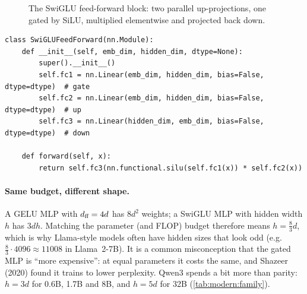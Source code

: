 \begin{figure}[t]
\centering
{}
\caption{The SwiGLU feed-forward block: two parallel up-projections, one gated by SiLU, multiplied
elementwise and projected back down.}
\label{fig:modern:swiglu}
\end{figure}

\begin{lstlisting}[caption={SwiGLU feed-forward network.},label={lst:modern:swiglu}]
class SwiGLUFeedForward(nn.Module):
    def __init__(self, emb_dim, hidden_dim, dtype=None):
        super().__init__()
        self.fc1 = nn.Linear(emb_dim, hidden_dim, bias=False, dtype=dtype)  # gate
        self.fc2 = nn.Linear(emb_dim, hidden_dim, bias=False, dtype=dtype)  # up
        self.fc3 = nn.Linear(hidden_dim, emb_dim, bias=False, dtype=dtype)  # down

    def forward(self, x):
        return self.fc3(nn.functional.silu(self.fc1(x)) * self.fc2(x))
\end{lstlisting}

\paragraph{Same budget, different shape.}
A GELU MLP with $d_{\text{ff}}=4d$ has $8d^2$ weights; a SwiGLU MLP with hidden width $h$ has $3dh$. Matching
the parameter (and FLOP) budget therefore means $h=\tfrac83 d$, which is why Llama-style models
often have hidden sizes that look odd (e.g.\ $\tfrac83\cdot4096\approx11008$ in Llama~2-7B). It is a
common misconception that the gated MLP is ``more expensive'': at equal parameters it costs the same,
and Shazeer (2020) found it trains to lower perplexity. Qwen3 spends a bit more than parity: $h=3d$ for
0.6B, 1.7B and 8B, and $h=5d$ for 32B (\cref{tab:modern:family}).

